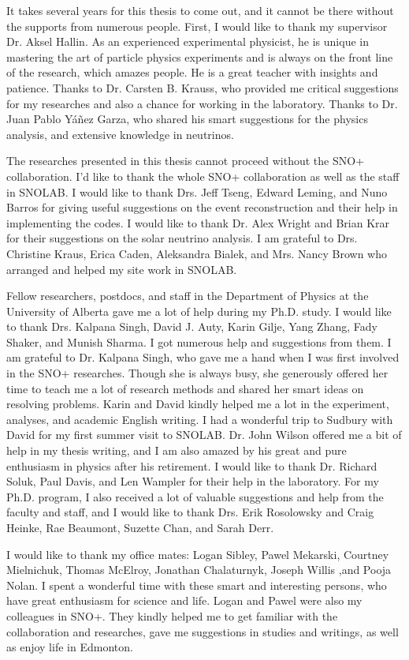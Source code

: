 It takes several years for this thesis to come out, and it cannot be there without the supports from numerous people. First, I would like to thank my supervisor Dr. Aksel Hallin. As an experienced experimental physicist, he is unique in mastering the art of particle physics experiments and is always on the front line of the research, which amazes people. He is a great teacher with insights and patience. Thanks to Dr. Carsten B. Krauss, who provided me critical suggestions for my researches and also a chance for working in the laboratory. Thanks to Dr. Juan Pablo Y\'{a}\~{n}ez Garza, who shared his smart suggestions for the physics analysis, and extensive knowledge in neutrinos. 

The researches presented in this thesis cannot proceed without the SNO+ collaboration. I'd like to thank the whole SNO+ collaboration as well as the staff in SNOLAB. I would like to thank Drs. Jeff Tseng, Edward Leming, and Nuno Barros for giving useful suggestions on the event reconstruction and their help in implementing the codes. I would like to thank Dr. Alex Wright and Brian Krar for their suggestions on the solar neutrino analysis. I am grateful to Drs. Christine Kraus, Erica Caden, Aleksandra Bialek, and Mrs. Nancy Brown who arranged and helped my site work in SNOLAB.

Fellow researchers, postdocs, and staff in the Department of Physics at the University of Alberta gave me a lot of help during my Ph.D. study. I would like to thank Drs. Kalpana Singh, David J. Auty, Karin Gilje, Yang Zhang, Fady Shaker, and Munish Sharma. I got numerous help and suggestions from them. I am grateful to Dr. Kalpana Singh, who gave me a hand when I was first involved in the SNO+ researches. Though she is always busy, she generously offered her time to teach me a lot of research methods and shared her smart ideas on resolving problems. Karin and David kindly helped me a lot in the experiment, analyses, and academic English writing. I had a wonderful trip to Sudbury with David for my first summer visit to SNOLAB. Dr. John Wilson offered me a bit of help in my thesis writing, and I am also amazed by his great and pure enthusiasm in physics after his retirement. I would like to thank Dr. Richard Soluk, Paul Davis, and Len Wampler for their help in the laboratory. For my Ph.D. program, I also received a lot of valuable suggestions and help from the faculty and staff, and I would like to thank Drs. Erik Rosolowsky and Craig Heinke, Rae Beaumont, Suzette Chan, and Sarah Derr.

I would like to thank my office mates: Logan Sibley, Pawel Mekarski, Courtney Mielnichuk, Thomas McElroy, Jonathan Chalaturnyk, Joseph Willis ,and Pooja Nolan. I spent a wonderful time with these smart and interesting persons, who have great enthusiasm for science and life. Logan and Pawel were also my colleagues in SNO+. They kindly helped me to get familiar with the collaboration and researches, gave me suggestions in studies and writings, as well as enjoy life in Edmonton.

